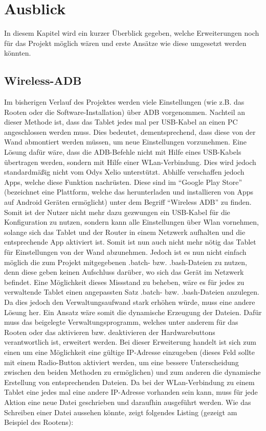 \chapter{ Ausblick }\label{chap:Ausblick}
\vspace*{-3cm}
\begin{flushleft}
In diesem Kapitel wird ein kurzer Überblick gegeben, welche Erweiterungen noch für das Projekt möglich wären und erste Ansätze wie diese umgesetzt werden könnten. 

\section{Wireless-ADB}
Im bisherigen Verlauf des Projektes werden viele Einstellungen (wie z.B. das Rooten oder die Software-Installation) über ADB vorgenommen. Nachteil an dieser Methode ist, dass das Tablet jedes mal per USB-Kabel an einen PC angeschlossen werden muss. Dies bedeutet, dementsprechend, dass diese von der Wand abmontiert werden müssen, um neue Einstellungen vorzunehmen. Eine Lösung dafür wäre, dass die ADB-Befehle nicht mit Hilfe eines USB-Kabels übertragen werden, sondern mit Hilfe einer WLan-Verbindung. Dies wird jedoch standardmäßig nicht vom Odys Xelio unterstützt. Abhilfe verschaffen jedoch Apps, welche diese Funktion nachrüsten. Diese sind im ``Google Play Store'' (bezeichnet eine Plattform, welche das herunterladen und installieren von Apps auf Android Geräten ermöglicht) unter dem Begriff ``Wireless ADB'' zu finden. Somit ist der Nutzer nicht mehr dazu gezwungen ein USB-Kabel für die Konfiguration zu nutzen, sondern kann alle Einstellungen über Wlan vornehmen, solange sich das Tablet und der Router in einem Netzwerk aufhalten und die entsprechende App aktiviert ist. Somit ist nun auch nicht mehr nötig das Tablet für Einstellungen von der Wand abzunehmen. 
Jedoch ist es nun nicht einfach möglich die zum Projekt mitgegebenen .batch- bzw. .bash-Dateien zu nutzen, denn diese geben keinen Aufschluss darüber, wo sich das Gerät im Netzwerk befindet. Eine Möglichkeit dieses Missstand zu beheben, wäre es für jedes zu verwaltende Tablet einen angepassten Satz .batch- bzw. .bash-Dateien anzulegen. Da dies jedoch den Verwaltungsaufwand stark erhöhen würde, muss eine andere Lösung her. Ein Ansatz wäre somit die dynamische Erzeugung der Dateien. Dafür muss das beigelegte Verwaltungsprogramm, welches unter anderem für das Rooten oder das aktivieren bzw. deaktivieren der Hardwarebuttons verantwortlich ist, erweitert werden. Bei dieser Erweiterung handelt ist sich zum einen um eine Möglichkeit eine gültige IP-Adresse einzugeben (dieses Feld sollte mit einem Radio-Button aktiviert werden, um eine bessere Unterscheidung zwischen den beiden Methoden zu ermöglichen) und zum anderen die dynamische Erstellung von entsprechenden Dateien. Da bei der WLan-Verbindung zu einem Tablet eine jedes mal eine andere IP-Adresse vorhanden sein kann, muss für jede Aktion eine neue Datei geschrieben und daraufhin ausgeführt werden. Wie das Schreiben einer Datei aussehen könnte, zeigt folgendes Listing (gezeigt am Beispiel des Rootens):

\end{flushleft}
